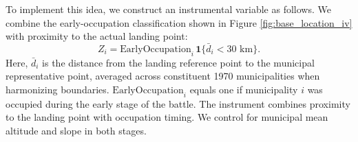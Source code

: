 \documentclass[12pt, unicode, a4paper]{article}
\newcommand{\1}{\mbox{1}\hspace{-0.25em}\mbox{l}} %
\begin{document}
To implement this idea, we construct an instrumental variable as follows. 
We combine the early-occupation classification shown in Figure \ref{fig:base_location_iv} with proximity to the actual landing point:
\begin{equation}
  Z_i = \mathrm{Early Occupation}_i\,\mathbf{1}\{\bar d_i<30\text{ km}\}.
  \label{eq:base_location_instrument}
\end{equation}
Here, $\bar d_i$ is the distance from the landing reference point to the municipal representative point, averaged across constituent 1970 municipalities when harmonizing boundaries. $\mathrm{Early Occupation}_i$ equals one if municipality $i$ was occupied during the early stage of the battle. The instrument combines proximity to the landing point with occupation timing. We control for municipal mean altitude and slope in both stages.
\end{document}
